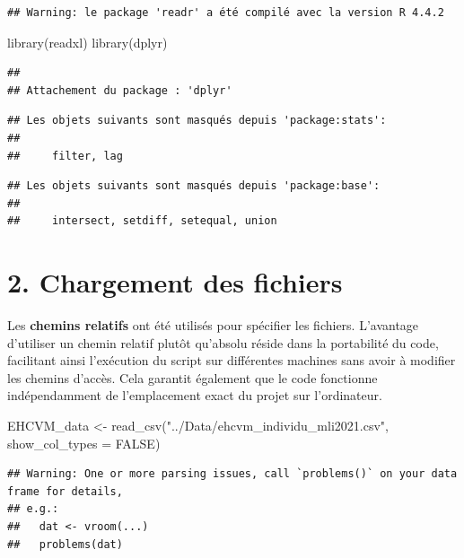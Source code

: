 \documentclass[
]{article}
\newenvironment{Shaded}{\begin{snugshade}}{\end{snugshade}}
\newcommand{\AttributeTok}[1]{\textcolor[rgb]{0.77,0.63,0.00}{#1}}
\newcommand{\ConstantTok}[1]{\textcolor[rgb]{0.00,0.00,0.00}{#1}}
\newcommand{\FunctionTok}[1]{\textcolor[rgb]{0.00,0.00,0.00}{#1}}
\newcommand{\NormalTok}[1]{#1}
\newcommand{\OtherTok}[1]{\textcolor[rgb]{0.56,0.35,0.01}{#1}}
\newcommand{\StringTok}[1]{\textcolor[rgb]{0.31,0.60,0.02}{#1}}
\begin{document}
\begin{verbatim}
## Warning: le package 'readr' a été compilé avec la version R 4.4.2
\end{verbatim}

\begin{Shaded}
\begin{Highlighting}[]
\FunctionTok{library}\NormalTok{(readxl)  }
\FunctionTok{library}\NormalTok{(dplyr)}
\end{Highlighting}
\end{Shaded}

\begin{verbatim}
## 
## Attachement du package : 'dplyr'
\end{verbatim}

\begin{verbatim}
## Les objets suivants sont masqués depuis 'package:stats':
## 
##     filter, lag
\end{verbatim}

\begin{verbatim}
## Les objets suivants sont masqués depuis 'package:base':
## 
##     intersect, setdiff, setequal, union
\end{verbatim}

\hypertarget{chargement-des-fichiers}{%
\section{2. Chargement des fichiers}\label{chargement-des-fichiers}}

Les \textbf{chemins relatifs} ont été utilisés pour spécifier les
fichiers. L'avantage d'utiliser un chemin relatif plutôt qu'absolu
réside dans la portabilité du code, facilitant ainsi l'exécution du
script sur différentes machines sans avoir à modifier les chemins
d'accès. Cela garantit également que le code fonctionne indépendamment
de l'emplacement exact du projet sur l'ordinateur.

\begin{Shaded}
\begin{Highlighting}[]
\NormalTok{EHCVM\_data }\OtherTok{\textless{}{-}} \FunctionTok{read\_csv}\NormalTok{(}\StringTok{"../Data/ehcvm\_individu\_mli2021.csv"}\NormalTok{,}
                       \AttributeTok{show\_col\_types =} \ConstantTok{FALSE}\NormalTok{)  }
\end{Highlighting}
\end{Shaded}

\begin{verbatim}
## Warning: One or more parsing issues, call `problems()` on your data frame for details,
## e.g.:
##   dat <- vroom(...)
##   problems(dat)
\end{verbatim}
\end{document}
